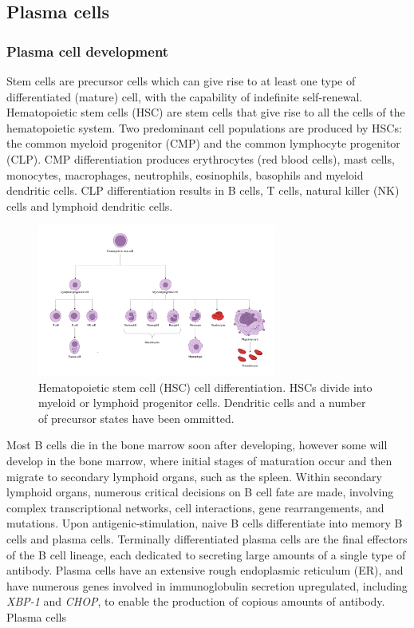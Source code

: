 \subsection{Plasma cells}
\subsubsection{Plasma cell development}
Stem cells are precursor cells which can give rise to at least one type of differentiated (mature) cell, with the capability of indefinite self-renewal.
Hematopoietic stem cells (HSC) are stem cells that give rise to all the cells of the hematopoietic system.
Two predominant cell populations are produced by HSCs: the common myeloid progenitor (CMP) and the common lymphocyte progenitor (CLP).
CMP differentiation produces erythrocytes (red blood cells), mast cells, monocytes, macrophages, neutrophils, eosinophils, basophils and myeloid dendritic cells.
CLP differentiation results in B cells, T cells, natural killer (NK) cells and lymphoid dendritic cells.

\begin{figure}
\centering\includegraphics[width=0.7\textwidth]{figures/Introduction/immune_cells.png}
\caption[Hematopoietic system cell differentiation]{Hematopoietic stem cell (HSC) cell differentiation. HSCs divide into myeloid or lymphoid progenitor cells. Dendritic cells and a number of precursor states have been ommitted. }
\label{fig:HSC_differentiation}\end{figure}

Most B cells die in the bone marrow soon after developing, however some will develop in the bone marrow, where initial stages of maturation occur and then migrate to secondary lymphoid organs, such as the spleen.
Within secondary lymphoid organs, numerous critical decisions on B cell fate are made, involving complex transcriptional networks, cell interactions, gene rearrangements, and mutations\cite{roth2014tracking,jourdan2011characterization}.
Upon antigenic-stimulation, naive B cells differentiate into memory B cells and plasma cells.
Terminally differentiated plasma cells are the final effectors of the B cell lineage, each dedicated to secreting large amounts of a single type of antibody.
Plasma cells have an extensive rough endoplasmic reticulum (ER), and have numerous genes involved in immunoglobulin secretion upregulated, including \textit{XBP-1} and \textit{CHOP}\cite{shapiro2004plasma}, to enable the production of copious amounts of antibody.
Plasma cells

